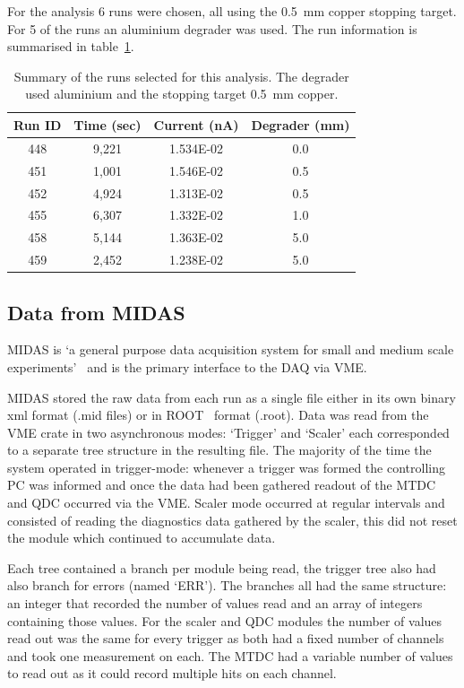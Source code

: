 For the analysis 6 runs were chosen, all using the 0.5~mm copper stopping target. For 5 of the runs an aluminium degrader was used. The run information is summarised in table~\ref{tab:run_summary}.
\begin{table}
	\begin{center}
	\begin{tabular}{c|c|c|c}
		Run ID & Time (sec) & Current (nA) & Degrader (mm) \\
		\hline
		448    & 9,221      & 1.534E-02    & 0.0   \\
		451    & 1,001      & 1.546E-02    & 0.5   \\
		452    & 4,924      & 1.313E-02    & 0.5   \\
		455    & 6,307      & 1.332E-02    & 1.0   \\
		458    & 5,144      & 1.363E-02    & 5.0   \\
		459    & 2,452      & 1.238E-02    & 5.0   \\
	\end{tabular}
	\end{center}
	\caption{Summary of the runs selected for this analysis. The degrader used aluminium and the stopping target 0.5~mm copper.}
	\label{tab:run_summary}
\end{table} 
\subsection{Data from MIDAS} %
\label{sub:data_from_midas}
MIDAS is `a general purpose data acquisition system for small and medium scale experiments'~\cite{ritt2012midas} and is the primary interface to the DAQ via VME. 

MIDAS stored the raw data from each run as a single file either in its own binary xml format (.mid files) or in ROOT~\cite{Brun199781} format (.root). Data was read from the VME crate in two asynchronous modes: `Trigger' and `Scaler' each corresponded to a separate tree structure in the resulting file. The majority of the time the system operated in trigger-mode: whenever a trigger was formed the controlling PC was informed and once the data had been gathered readout of the MTDC and QDC occurred via the VME. Scaler mode occurred at regular intervals and consisted of reading the diagnostics data gathered by the scaler, this did not reset the module which continued to accumulate data. 

Each tree contained a branch per module being read, the trigger tree also had also branch for errors (named `ERR'). The branches all had the same structure: an integer that recorded the number of values read and an array of integers containing those values. For the scaler and QDC modules the number of values read out was the same for every trigger as both had a fixed number of channels and took one measurement on each. The MTDC had a variable number of values to read out as it could record multiple hits on each channel.
